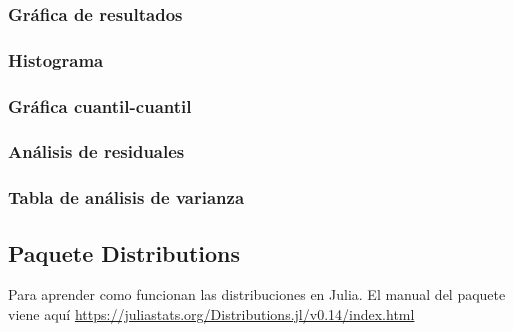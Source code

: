 \subsubsection{Gráfica de resultados}

\subsubsection{Histograma}

\subsubsection{Gráfica cuantil-cuantil}

\subsubsection{Análisis de residuales}

\subsubsection{Tabla de análisis de varianza}


\subsection{Paquete Distributions}
Para aprender como funcionan las distribuciones en Julia. El manual del paquete viene aquí \url{https://juliastats.org/Distributions.jl/v0.14/index.html}




